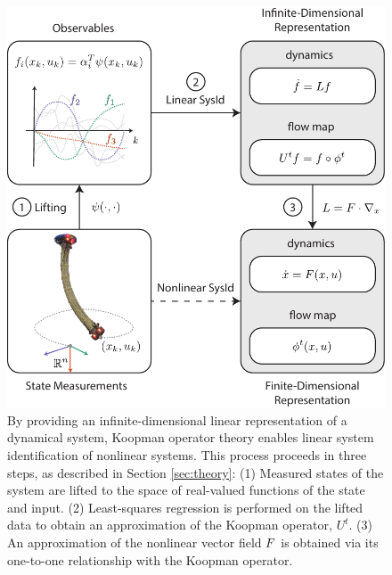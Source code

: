\begin{figure}[t]
    \centering
    \includegraphics[width=\linewidth]{figures/overviewDiagram_eqBigger.pdf}
    \caption{By providing an infinite-dimensional linear representation of a dynamical system, Koopman operator theory enables linear system identification of nonlinear systems. 
    This process proceeds in three steps, as described in Section \ref{sec:theory}:
    (1) Measured states of the system are lifted to the space of real-valued functions of the state and input.
    (2) Least-squares regression is performed on the lifted data to obtain an approximation of the Koopman operator, $U^t$.
    (3) An approximation of the nonlinear vector field $F$ is obtained via its one-to-one relationship with the Koopman operator.}
    \label{fig:overview}
\end{figure}


